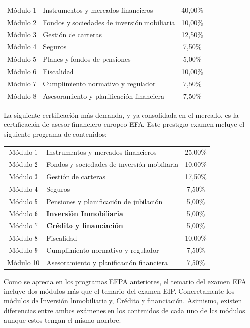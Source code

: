 \documentclass[
  letterpaper,
  DIV=11,
  numbers=noendperiod]{scrreprt}
\begin{document}
\begin{longtable}[]{@{}clc@{}}
\toprule()
\endhead
Módulo 1 & Instrumentos y mercados financieros & 40,00\% \\
Módulo 2 & Fondos y sociedades de inversión mobiliaria & 10,00\% \\
Módulo 3 & Gestión de carteras & 12,50\% \\
Módulo 4 & Seguros & 7,50\% \\
Módulo 5 & Planes y fondos de pensiones & 5,00\% \\
Módulo 6 & Fiscalidad & 10,00\% \\
Módulo 7 & Cumplimiento normativo y regulador & 7,50\% \\
Módulo 8 & Asesoramiento y planificación financiera & 7,50\% \\
\bottomrule()
\end{longtable}

La siguiente certificación más demanda, y ya consolidada en el mercado,
es la certificación de asesor financiero europeo EFA. Este prestigio
examen incluye el siguiente programa de contenidos:

\begin{longtable}[]{@{}clc@{}}
\toprule()
\endhead
Módulo 1 & Instrumentos y mercados financieros & 25,00\% \\
Módulo 2 & Fondos y sociedades de inversión mobiliaria & 10,00\% \\
Módulo 3 & Gestión de carteras & 17,50\% \\
Módulo 4 & Seguros & 7,50\% \\
Módulo 5 & Pensiones y planificación de jubilación & 5,00\% \\
Módulo 6 & \textbf{Inversión Inmobiliaria} & 5,00\% \\
Módulo 7 & \textbf{Crédito y financiación} & 5,00\% \\
Módulo 8 & Fiscalidad & 10,00\% \\
Módulo 9 & Cumplimiento normativo y regulador & 7,50\% \\
Módulo 10 & Asesoramiento y planificación financiera & 7,50\% \\
\bottomrule()
\end{longtable}

Como se aprecia en los programas EFPA anteriores, el temario del examen
EFA incluye dos módulos más que el temario del examen EIP. Concretamente
los módulos de Inversión Inmobiliaria y, Crédito y financiación.
Asimismo, existen diferencias entre ambos exámenes en los contenidos de
cada uno de los módulos aunque estos tengan el mismo nombre.
\end{document}
